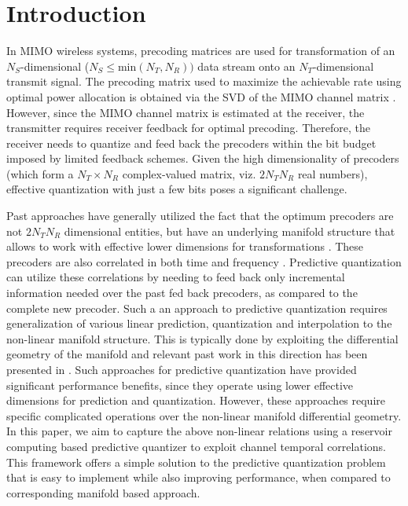 \documentclass[conference]{IEEEtran}
\begin{document}
\section{Introduction}
\label{intro}
In MIMO wireless systems, precoding matrices are used for transformation of an $N_S$-dimensional ($N_S \leq \text{min}(N_T,N_R))$ data stream onto an $N_T$-dimensional transmit signal.
The precoding matrix used to maximize the achievable rate using optimal power allocation is obtained via the SVD of the MIMO channel matrix \cite{love2008overview}.
However, since the MIMO channel matrix is estimated at the receiver, the transmitter requires receiver feedback for optimal precoding.
Therefore, the receiver needs to quantize and feed back the precoders within the bit budget imposed by limited feedback schemes.
Given the high dimensionality of precoders (which form a $N_T \times N_R$ complex-valued matrix, viz. $2N_TN_R$ real numbers), effective quantization with just a few bits poses a significant challenge.

Past approaches have generally utilized the fact that the optimum precoders are not $2N_TN_R$ dimensional entities, but have an underlying manifold structure that allows to work with effective lower dimensions for transformations \cite{pitaval2013codebooks}.
These precoders are also correlated in both time and frequency \cite{5946308,khaled2005quantized}.
Predictive quantization can utilize these correlations by needing to feed back only incremental information needed over the past fed back precoders, as compared to the complete new precoder.
Such a an approach to predictive quantization requires generalization of various linear prediction, quantization and interpolation to the non-linear manifold structure.
This is typically done by exploiting the differential geometry of the manifold and relevant past work in this direction has been presented in \cite{6891198,6545375,5671092,Li2016,krishnamachari2013geometry,chang2011adaptive}.
Such approaches for predictive quantization have provided significant performance benefits, since they operate using lower effective dimensions for prediction and quantization.
However, these approaches require specific complicated operations over the non-linear manifold differential geometry.
In this paper, we aim to capture the above non-linear relations using a reservoir computing based predictive quantizer to exploit channel temporal correlations.
This framework offers a simple solution to the predictive quantization problem that is easy to implement while also improving performance, when compared to corresponding manifold based approach.
\end{document}
